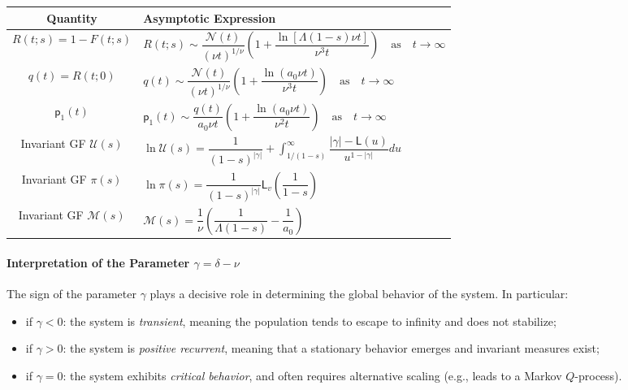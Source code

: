 \documentclass[10pt,reqno]{amsart}
\theoremstyle{definition}
\numberwithin{equation}{section}
\begin{document}
\begin{table}[h!]
\centering
\renewcommand{\arraystretch}{2.4}
\begin{tabular}{|c|p{10cm}|}
\hline
\textbf{Quantity} & \textbf{Asymptotic Expression} \\
\hline
$R(t;s)=1-F(t;s)$ &
$R(t;s) \sim \dfrac{\mathcal{N}(t)}{(\nu{t})^{1/\nu}} \left(1 + \dfrac{\ln[\Lambda(1-s)\nu{t}]}{\nu^3{t}}\right)
    \quad \text{as} \quad {t\to\infty}$ \\
\hline
$q(t)=R(t;0)$ &
$q(t) \sim \dfrac{\mathcal{N}(t)}{(\nu{t})^{1/\nu}} \left(1 + \dfrac{\ln(a_0 \nu{t})}{\nu^3{t}}\right)
    \quad \text{as} \quad {t\to\infty}$ \\
\hline
$\textsf{p}_1(t)$ &
$\textsf{p}_1(t) \sim \dfrac{q(t)}{a_0 \nu{t}} \left(1 + \dfrac{\ln(a_0 \nu{t})}{\nu^2{t}}\right)
    \quad \text{as} \quad {t\to\infty}$ \\
\hline
Invariant GF $\mathcal{U}(s)$ &
$\ln\mathcal{U}(s)=\dfrac{1}{(1-s)^{|\gamma|}}+\int_{1/(1-s)}^{\infty} \dfrac{|\gamma|-\textsf{L}(u)}{u^{1-|\gamma|}}du$ \\
\hline
Invariant GF $\pi(s)$ &
$\ln\pi(s)=\dfrac{1}{(1-s)^{|\gamma|}}\textsf{L}_v\left(\dfrac{1}{1-s}\right)$ \\
\hline
Invariant GF $\mathcal{M}(s)$ &
$\mathcal{M}(s)=\dfrac{1}{\nu}\left(\dfrac{1}{\Lambda(1-s)}-\dfrac{1}{a_0}\right)$ \\
\hline
\end{tabular}
\end{table}

\paragraph{Interpretation of the Parameter \(\gamma=\delta-\nu\)}
    The sign of the parameter \(\gamma\) plays a decisive role in determining the global behavior of the system. In particular:

\begin{itemize}
\item if \(\gamma < 0\): the system is \emph{transient}, meaning the population tends to escape to infinity and does not stabilize;
\item if \(\gamma > 0\): the system is \emph{positive recurrent}, meaning that a stationary behavior emerges and invariant measures exist;
\item if \(\gamma = 0\): the system exhibits \emph{critical behavior}, and often requires alternative scaling (e.g., leads to a Markov $Q$-process).
\end{itemize}
\end{document}
